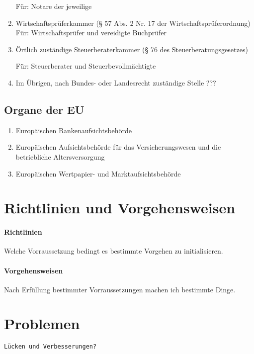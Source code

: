\documentclass{article}
\begin{document}
\begin{enumerate}
                    Für: Notare der jeweilige 

                \item Wirtschaftsprüferkammer (§ 57 Abs. 2 Nr. 17 der Wirtschaftsprüferordnung)
                Für: Wirtschaftsprüfer und vereidigte Buchprüfer

                \item Örtlich zuständige Steuerberaterkammer (§ 76 des Steuerberatungsgesetzes)

                    Für: Steuerberater und Steuerbevollmächtigte

                \item Im Übrigen, nach Bundes- oder Landesrecht zuständige Stelle ???

            \end{enumerate}

        \subsection[Organe EU]{Organe der EU}

            \begin{enumerate}

                \item Europäischen Bankenaufsichtsbehörde 

                \item Europäischen Aufsichtsbehörde für das Versicherungswesen und die betriebliche Altersversorgung 

                \item Europäischen Wertpapier- und Marktaufsichtsbehörde 

            \end{enumerate}        


    \section[Richtlinien und Vorgehensweisen]{Richtlinien und Vorgehensweisen}

        \paragraph[Richtlinien]{Richtlinien}
            Welche Vorraussetzung bedingt es bestimmte Vorgehen zu initialisieren.

        \paragraph[Vorgehensweisen]{Vorgehensweisen}
            Nach Erfüllung bestimmter Vorraussetzungen machen ich bestimmte Dinge.

    \section[Probleme]{Problemen}

        \texttt{Lücken und Verbesserungen?}
\end{document}
